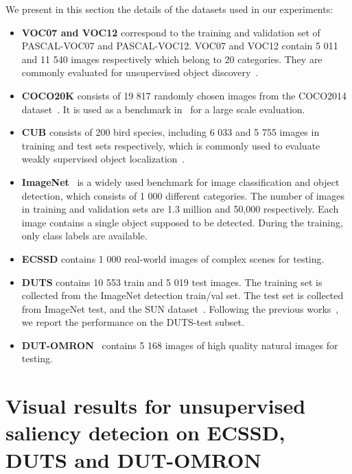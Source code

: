 \documentclass[twocolumn]{article}
\newenvironment{Itemize}{
\setlength{\leftmargini}{9pt}\begin{itemize}\setlength{\itemsep}{0pt}\setlength{\topsep}{0pt}\setlength{\partopsep}{0pt}\setlength{\parskip}{0pt}}{\end{itemize}}
\begin{document}
We present in this section the details of the datasets used in our experiments: 
\begin{Itemize}
\item \textbf{VOC07 and VOC12}  correspond to the training and validation set of PASCAL-VOC07 and PASCAL-VOC12. VOC07 and VOC12 contain 5 011 and 11 540 images respectively which belong to 20 categories. They are commonly evaluated for unsupervised object discovery~\cite{vo2020toward,vo2021large,vo2019unsupervised, wei2019unsupervised,cho2015unsupervised}. 

\item \textbf{COCO20K} consists of 19 817 randomly chosen images from the COCO2014 dataset~\cite{lin2014microsoft}. It is used as a benchmark in~\cite{vo2020toward} for a large scale evaluation. 

\item \textbf{CUB} consists of 200 bird species, including 6 033 and 5 755 images in training and test sets respectively, which is commonly used to evaluate weakly supervised object localization~\cite{zhou2016learning,singh2017hide,bae2020rethinkingCAM,szegedy2015going,choe2019attention}.

\item \textbf{ImageNet}~\cite{deng2009imagenet} is a widely used benchmark for image classification and object detection, which consists of 1 000 different categories. The number of images in training and validation sets are 1.3 million and 50,000 respectively. Each image contains a single object supposed to be detected. During the training, only class labels are available. 

\item \textbf{ECSSD} contains 1 000 real-world images of complex scenes for testing. 

\item \textbf{DUTS} contains 10 553 train and 5 019 test images. The training set is collected from the ImageNet detection train/val set. The test set is collected from ImageNet test, and the SUN dataset~\cite{Xiao2010Sun}. Following the previous works~\cite{shen2021learning}, we report the performance on the DUTS-test subset. 

\item \textbf{DUT-OMRON}~\cite{yang2013saliency} contains 5 168 images of high quality natural images for testing.
\end{Itemize}

\section{Visual results for unsupervised saliency detecion on ECSSD, DUTS and DUT-OMRON}
\label{sec:usd}
\end{document}
